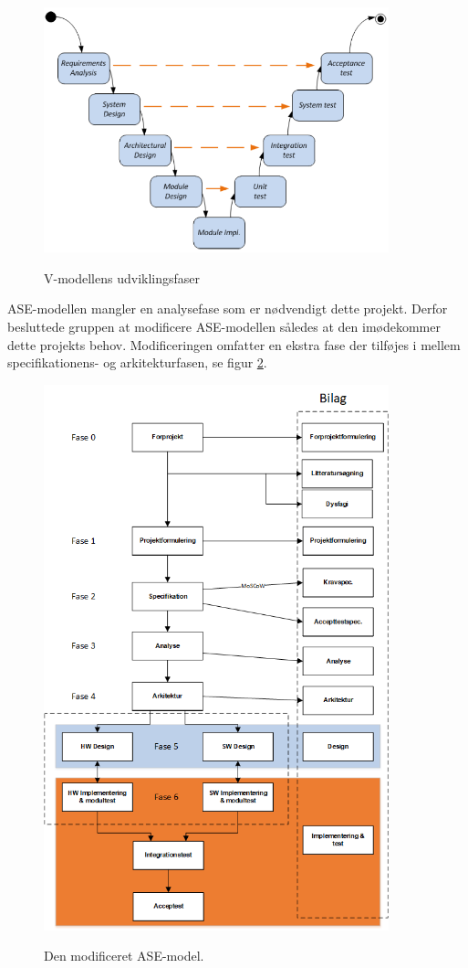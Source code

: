 \begin{figure}[H]
\centering
{\includegraphics[width=10cm]
{Figure/vmodel}}
\caption{V-modellens udviklingsfaser\cite{IngeniorhojskolenAarhusUniversiteta}}
\label{fig:vmodel}
\end{figure}

ASE-modellen mangler en analysefase som er nødvendigt dette projekt. Derfor besluttede gruppen at modificere ASE-modellen således at den imødekommer dette projekts behov. Modificeringen omfatter en ekstra fase der tilføjes i mellem specifikationens- og arkitekturfasen, se figur \ref{fig:procesVoresASE}.


\begin{figure}[H]
\centering
{\includegraphics[width=10cm]
{Figure/procesVoresASE}}
\caption{Den modificeret ASE-model.}
\label{fig:procesVoresASE}
\end{figure}

